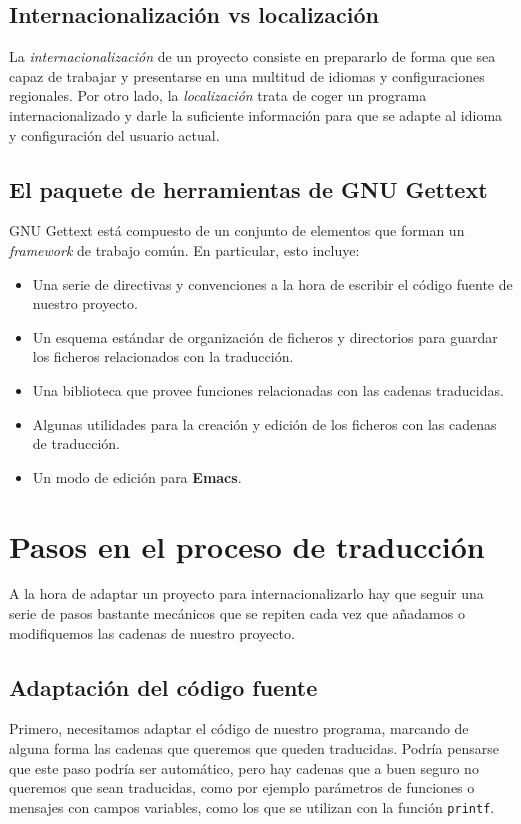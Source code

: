 \subsection{Internacionalización vs localización}

La \textit{internacionalización} de un proyecto consiste en prepararlo de forma
que sea capaz de trabajar y presentarse en una multitud de idiomas y
configuraciones regionales. Por otro lado, la \textit{localización} trata de
coger un programa internacionalizado y darle la suficiente información para que
se adapte al idioma y configuración del usuario actual.

\subsection{El paquete de herramientas de GNU Gettext}

GNU Gettext está compuesto de un conjunto de elementos que forman un
\textit{framework} de trabajo común. En particular, esto incluye:
\begin{itemize}
\item Una serie de directivas y convenciones a la hora de escribir el código
  fuente de nuestro proyecto.
\item Un esquema estándar de organización de ficheros y directorios para guardar
  los ficheros relacionados con la traducción.
\item Una biblioteca que provee funciones relacionadas con las cadenas
  traducidas.
\item Algunas utilidades para la creación y edición de los ficheros con las
  cadenas de traducción.
\item Un modo de edición para \textbf{Emacs}.
\end{itemize}

\section{Pasos en el proceso de traducción}

A la hora de adaptar un proyecto para internacionalizarlo hay que seguir una
serie de pasos bastante mecánicos que se repiten cada vez que añadamos o
modifiquemos las cadenas de nuestro proyecto.

\subsection{Adaptación del código fuente}

Primero, necesitamos adaptar el código de nuestro programa, marcando de alguna
forma las cadenas que queremos que queden traducidas. Podría pensarse que este
paso podría ser automático, pero hay cadenas que a buen seguro no queremos que
sean traducidas, como por ejemplo parámetros de funciones o mensajes con campos
variables, como los que se utilizan con la función \texttt{printf}.

